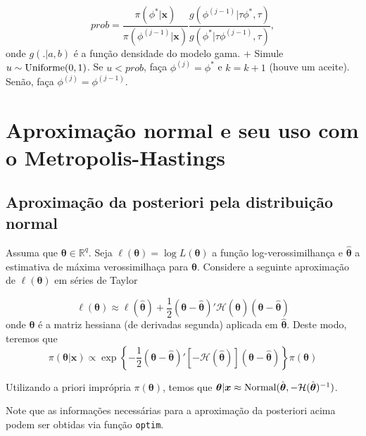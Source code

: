 \documentclass[
  letterpaper,
  DIV=11,
  numbers=noendperiod]{scrreprt}
\theoremstyle{definition}
\theoremstyle{definition}
\theoremstyle{remark}
\begin{document}
\[prob = \frac{\pi(\phi^*|\boldsymbol{x})}{\pi(\phi^{(j-1)}|\boldsymbol{x})}\frac{g(\phi^{(j-1)}|\tau\phi^*,\tau)}{g(\phi^*|\tau\phi^{(j-1)},\tau)},\]
onde \(g(.|a,b)\) é a função densidade do modelo gama. + Simule
\(u\sim\hbox{Uniforme}(0,1)\). Se \(u<prob\), faça \(\phi^{(j)}=\phi^*\)
e \(k=k+1\) (houve um aceite). Senão, faça \(\phi^{(j)}=\phi^{(j-1)}\).


\hypertarget{aproximauxe7uxe3o-normal-e-seu-uso-com-o-metropolis-hastings}{%
\chapter{Aproximação normal e seu uso com o
Metropolis-Hastings}\label{aproximauxe7uxe3o-normal-e-seu-uso-com-o-metropolis-hastings}}

\hypertarget{aproximauxe7uxe3o-da-posteriori-pela-distribuiuxe7uxe3o-normal}{%
\section{Aproximação da posteriori pela distribuição
normal}\label{aproximauxe7uxe3o-da-posteriori-pela-distribuiuxe7uxe3o-normal}}

Assuma que \(\boldsymbol{\theta}\in\mathbb{R}^q\). Seja
\(\ell(\boldsymbol{\theta})=\log L(\boldsymbol{\theta})\) a função
log-verossimilhança e \(\hat{\boldsymbol{\theta}}\) a estimativa de
máxima verossimilhaça para \(\boldsymbol{\theta}\). Considere a seguinte
aproximação de \(\ell(\boldsymbol{\theta})\) em séries de Taylor

\[\ell(\boldsymbol{\theta})\approx  \ell(\hat{\boldsymbol{\theta}})+\frac{1}{2}(\boldsymbol{\theta}-\hat{\boldsymbol{\theta}})'\mathcal{H}(\hat{\boldsymbol{\theta}})(\boldsymbol{\theta}-\hat{\boldsymbol{\theta}})\]
onde \(\boldsymbol{\theta}\) é a matriz hessiana (de derivadas segunda)
aplicada em \(\hat{\boldsymbol{\theta}}\). Deste modo, teremos que
\[\pi(\boldsymbol{\theta}|\boldsymbol{x})\propto \exp\left\{-\frac{1}{2}(\boldsymbol{\theta}-\hat{\boldsymbol{\theta}})'\left[-\mathcal{H}(\hat{\boldsymbol{\theta}})\right](\boldsymbol{\theta}-\hat{\boldsymbol{\theta}})\right\}\pi(\boldsymbol{\theta})\]

Utilizando a priori imprópria \(\pi(\boldsymbol{\theta})\), temos que
\(\boldsymbol{\theta}|\boldsymbol{x}\approx \hbox{Normal}(\hat{\boldsymbol{\theta}},-\mathcal{H}(\hat{\boldsymbol{\theta}})^{-1})\).

Note que as informações necessárias para a aproximação da posteriori
acima podem ser obtidas via função \texttt{optim}.
\end{document}
